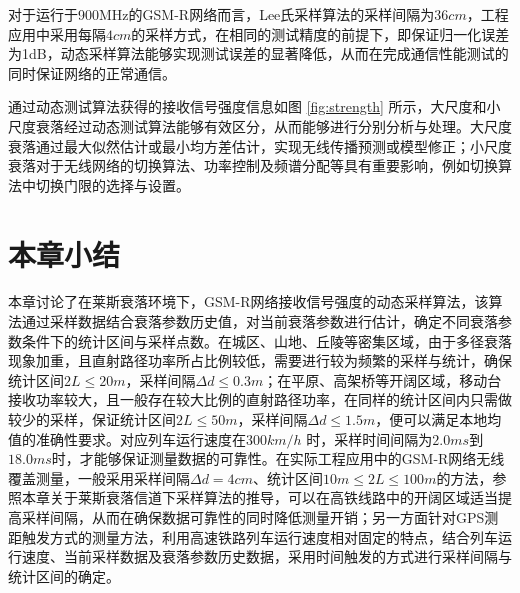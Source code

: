 \begin{figure}[!htp]
\centering
\hspace{1in}
\centering
\end{figure}

对于运行于900MHz的GSM-R网络而言，Lee氏采样算法的采样间隔为$36cm$，工程应用中采用每隔$4cm$的采样方式，在相同的测试精度的前提下，即保证归一化误差为1dB，动态采样算法能够实现测试误差的显著降低，从而在完成通信性能测试的同时保证网络的正常通信。

通过动态测试算法获得的接收信号强度信息如图 \ref{fig:strength} 所示，大尺度和小尺度衰落经过动态测试算法能够有效区分，从而能够进行分别分析与处理。大尺度衰落通过最大似然估计或最小均方差估计，实现无线传播预测或模型修正；小尺度衰落对于无线网络的切换算法、功率控制及频谱分配等具有重要影响，例如切换算法中切换门限的选择与设置。

\section{本章小结}
\label{sec:conclusion2}

本章讨论了在莱斯衰落环境下，GSM-R网络接收信号强度的动态采样算法，该算法通过采样数据结合衰落参数历史值，对当前衰落参数进行估计，确定不同衰落参数条件下的统计区间与采样点数。在城区、山地、丘陵等密集区域，由于多径衰落现象加重，且直射路径功率所占比例较低，需要进行较为频繁的采样与统计，确保统计区间$2L \leq 20m$，采样间隔$\Delta d \leq 0.3m$；在平原、高架桥等开阔区域，移动台接收功率较大，且一般存在较大比例的直射路径功率，在同样的统计区间内只需做较少的采样，保证统计区间$2L \leq 50m$，采样间隔$\Delta d \leq 1.5m$，便可以满足本地均值的准确性要求。对应列车运行速度在$300km/h$ 时，采样时间间隔为$2.0ms$到$18.0ms$时，才能够保证测量数据的可靠性。在实际工程应用中的GSM-R网络无线覆盖测量，一般采用采样间隔$\Delta d = 4cm$、统计区间$10m \leq 2L \leq 100m$的方法，参照本章关于莱斯衰落信道下采样算法的推导，可以在高铁线路中的开阔区域适当提高采样间隔，从而在确保数据可靠性的同时降低测量开销；另一方面针对GPS测距触发方式的测量方法，利用高速铁路列车运行速度相对固定的特点，结合列车运行速度、当前采样数据及衰落参数历史数据，采用时间触发的方式进行采样间隔与统计区间的确定。

\nocite{*}
